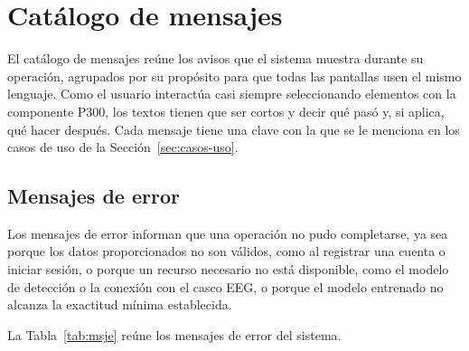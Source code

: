 \section[CATÁLOGO DE MENSAJES]{Catálogo de mensajes}

El catálogo de mensajes reúne los avisos que el sistema muestra durante su operación, agrupados
por su propósito para que todas las pantallas usen el mismo lenguaje. Como el usuario interactúa
casi siempre seleccionando elementos con la componente P300, los textos tienen que ser cortos y
decir qué pasó y, si aplica, qué hacer después. Cada mensaje tiene una clave con la que se le
menciona en los casos de uso de la Sección~\ref{sec:casos-uso}.

\subsection{Mensajes de error}

Los mensajes de error informan que una operación no pudo completarse, ya sea porque los datos
proporcionados no son válidos, como al registrar una cuenta o iniciar sesión, o porque un recurso
necesario no está disponible, como el modelo de detección o la conexión con el casco EEG, o
porque el modelo entrenado no alcanza la exactitud mínima establecida.

La Tabla~\ref{tab:msje} reúne los mensajes de error del sistema.

